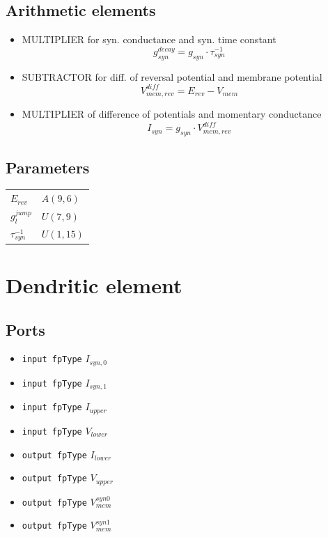 \documentclass[a4paper]{report}
\begin{document}
\subsection{Arithmetic elements}
\begin{itemize}
	\item MULTIPLIER for syn. conductance and syn. time constant
		\begin{equation}
			g_{syn}^{decay} = g_{syn} \cdot \tau_{syn}^{-1}
		\end{equation}
	\item SUBTRACTOR for diff. of reversal potential and membrane potential
		\begin{equation}
			V_{mem,rev}^{diff} = E_{rev} - V_{mem}
		\end{equation}
	\item MULTIPLIER of difference of potentials and momentary conductance
		\begin{equation}
			I_{syn} = g_{syn} \cdot V_{mem,rev}^{diff}
		\end{equation}
\end{itemize}
\subsection{Parameters}
\begin{tabular}{ll}
$E_{rev}$ & $A(9,6)$\\
$g_l^{jump}$ & $U(7,9)$\\
$\tau_{syn}^{-1}$ & $U(1,15)$\\
\end{tabular}
\section{Dendritic element}
\subsection{Ports}
	\begin{itemize}
		\item \texttt{input fpType} $I_{syn,0}$
		\item \texttt{input fpType} $I_{syn,1}$
		\item \texttt{input fpType} $I_{upper}$
		\item \texttt{input fpType} $V_{lower}$
		\item \texttt{output fpType} $I_{lower}$
		\item \texttt{output fpType} $V_{upper}$
		\item \texttt{output fpType} $V_{mem}^{syn0}$
		\item \texttt{output fpType} $V_{mem}^{syn1}$
	\end{itemize}
\end{document}
